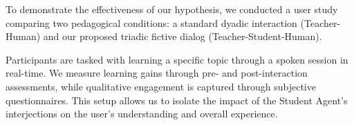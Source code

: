 To demonstrate the effectiveness of our hypothesis, we conducted a user study comparing two pedagogical conditions:
a standard dyadic interaction (Teacher-Human) and our proposed triadic fictive dialog (Teacher-Student-Human).

Participants are tasked with learning a specific topic through a spoken session in real-time.
We measure learning gains through pre- and post-interaction assessments, while qualitative engagement is captured through subjective questionnaires.
This setup allows us to isolate the impact of the Student Agent’s interjections on the user’s understanding and overall experience.
